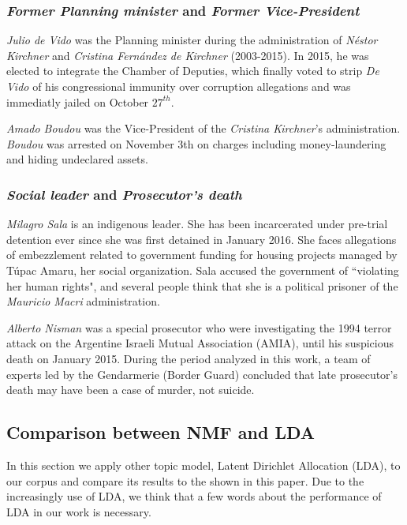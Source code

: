 \documentclass{bmcart}
\begin{document}
\subsubsection*{\emph{Former Planning minister} and \emph{Former Vice-President}}

\par \emph{Julio de Vido} was the Planning minister during the administration of \emph{N\'estor Kirchner} and \emph{Cristina Fern\'andez de Kirchner} (2003-2015). In 2015, he was elected to integrate the Chamber of Deputies, which finally voted to strip \emph{De Vido} of his congressional immunity over corruption allegations and was immediatly jailed on October $27^{th}$.

\par \emph{Amado Boudou} was the Vice-President of the \emph{Cristina Kirchner}'s administration.
\emph{Boudou} was arrested on November 3th on charges including money-laundering and hiding undeclared assets.

\subsubsection*{\emph{Social leader} and \emph{Prosecutor's death}}

\par \emph{Milagro Sala} is an indigenous leader. 
She has been incarcerated under pre-trial detention ever since she was first detained in January 2016. She faces allegations of embezzlement related to government funding for housing projects managed by T\'upac Amaru, her social organization.
Sala accused the government of ``violating her human rights", and several people think that she is a political prisoner of the \emph{Mauricio Macri} administration.

\par \emph{Alberto Nisman} was a special prosecutor who were investigating the 1994 terror attack on the Argentine Israeli Mutual Association (AMIA), until his suspicious death on January 2015.
During the period analyzed in this work, a team of experts led by the Gendarmerie (Border Guard) concluded that late prosecutor's death may have been a case of murder, not suicide.


\subsection*{Comparison between NMF and LDA}

\par In this section we apply other topic model, Latent Dirichlet Allocation \cite{blei2003latent} (LDA), to our corpus and compare its results to the shown in this paper. Due to the increasingly use of LDA, we think that a few words about the performance of LDA in our work is necessary. 
\end{document}
